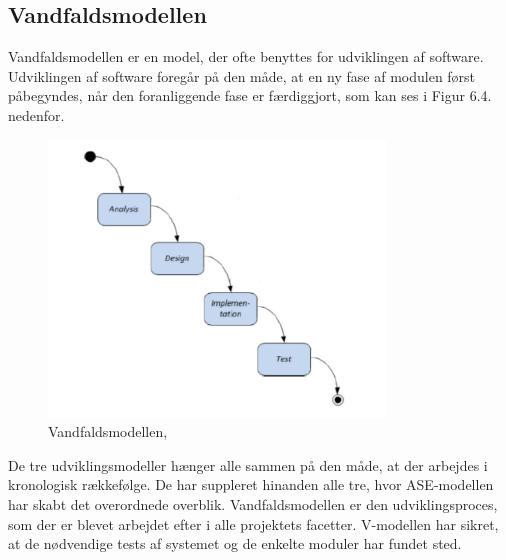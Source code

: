 \subsection{Vandfaldsmodellen}
Vandfaldsmodellen er en model, der ofte benyttes for udviklingen af software. Udviklingen af software foregår på den måde, at en ny fase af modulen først påbegyndes, når den foranliggende fase er færdiggjort, som kan ses i Figur 6.4. nedenfor. 
\begin{figure}[H]
	\centering
	\includegraphics[width=0.8\textwidth]{Figurer/vfmodel}
	\caption{Vandfaldsmodellen, \protect\cite{ISE}}
\end{figure}
De tre udviklingsmodeller hænger alle sammen på den måde, at der arbejdes i kronologisk rækkefølge. De har suppleret hinanden alle tre, hvor ASE-modellen har skabt det overordnede overblik. Vandfaldsmodellen er den udviklingsproces, som der er blevet arbejdet efter i alle projektets facetter. V-modellen har sikret, at de nødvendige tests af systemet og de enkelte moduler har fundet sted. 



